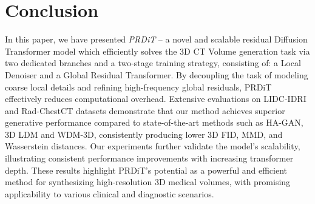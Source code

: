 \section{Conclusion}
In this paper, we have presented \emph{PRDiT} -- a novel and scalable residual Diffusion Transformer model which efficiently solves the 3D CT Volume generation task via two dedicated branches and a two-stage training strategy, consisting of: a Local Denoiser and a Global Residual Transformer. By decoupling the task of modeling coarse local details and refining high-frequency global residuals, PRDiT effectively reduces computational overhead. Extensive evaluations on LIDC-IDRI and Rad-ChestCT datasets demonstrate that our method achieves superior generative performance compared to state-of-the-art methods such as HA-GAN, 3D LDM and WDM-3D, consistently producing lower 3D FID, MMD, and Wasserstein distances. Our experiments further validate the model's scalability, illustrating consistent performance improvements with increasing transformer depth. These results highlight PRDiT's potential as a powerful and efficient method for synthesizing high-resolution 3D medical volumes, with promising applicability to various clinical and diagnostic scenarios.

